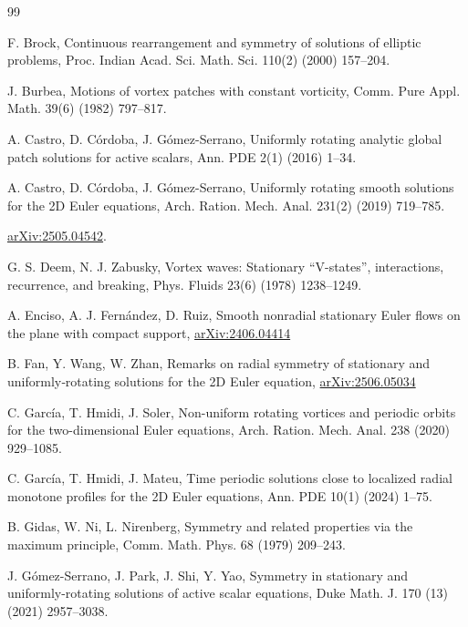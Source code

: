 \documentclass[11pt,oneside]{amsart}
\theoremstyle{definition}
\numberwithin{equation}{section}
\begin{document}

\begin{thebibliography}{99}\frenchspacing

 F. Brock, Continuous rearrangement and symmetry of solutions of elliptic problems, Proc. Indian
Acad. Sci. Math. Sci. 110(2) (2000) 157--204.

J. Burbea, Motions of vortex patches with constant vorticity,
Comm. Pure Appl. Math. 39(6) (1982) 797--817.

A. Castro, D. C\'ordoba, J. G\'omez-Serrano, Uniformly rotating analytic global patch solutions for active scalars, Ann. PDE {2}(1) (2016) 1--34.

A. Castro, D. C\'ordoba, J. G\'omez-Serrano, Uniformly rotating smooth solutions for the 2D Euler equations, Arch. Ration. Mech. Anal. 231(2) (2019) 719--785.

\href{https://arxiv.org/abs/2505.04542}{arXiv:2505.04542}.

G. S. Deem, N. J. Zabusky, Vortex waves: Stationary ``V-states'', interactions, recurrence, and breaking, Phys. Fluids 23(6) (1978) 1238--1249.

 A. Enciso, A. J. Fern\'andez, D. Ruiz, Smooth nonradial stationary Euler flows on the plane with compact support, \href{https://arxiv.org/abs/2406.04414}{arXiv:2406.04414}


B. Fan, Y. Wang, W. Zhan, {Remarks on radial symmetry of stationary and uniformly‑rotating solutions for the 2D Euler equation}, 
\href{https://arxiv.org/abs/2506.05034}{arXiv:2506.05034}

C. García, T. Hmidi, J. Soler, Non-uniform rotating vortices and periodic orbits for the two-dimensional Euler equations, Arch. Ration. Mech. Anal. {238} (2020) 929--1085.


C. Garc\'ia, T. Hmidi, J. Mateu, Time periodic solutions close to localized radial monotone profiles for the 2D Euler equations, Ann. PDE 10(1) (2024) 1--75.

 B. Gidas, W. Ni, L. Nirenberg, Symmetry and related properties via the maximum principle, Comm. Math.
Phys. 68 (1979) 209--243.


 J. G\'omez-Serrano, J. Park, J. Shi, Y. Yao, Symmetry in stationary and uniformly-rotating solutions of active scalar equations, Duke Math. J. 170 (13) (2021) 2957--3038.



\end{thebibliography}
\end{document}
